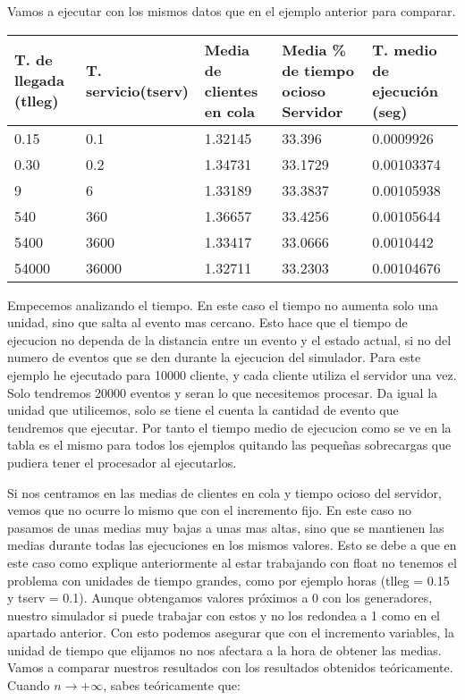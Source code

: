 \documentclass[]{article}
\begin{document}
Vamos a ejecutar con los mismos datos que en el ejemplo anterior para comparar.
	\begin{table}[H]
		\begin{center}
			\begin{tabularx}{0.9\textwidth}{|X|X|X|X|X|}
				\hline
				\textbf{T. de llegada (tlleg)} & \textbf{T. servicio(tserv)}&\textbf{Media de clientes en cola} & \textbf{Media \% de tiempo ocioso Servidor} & \textbf{T. medio de ejecución (seg)} \\
				\hline \hline
				0.15 & 0.1 & 1.32145 & 33.396 &0.0009926\\ \hline
				0.30 & 0.2 & 1.34731 & 33.1729 &0.00103374 \\ \hline
				9 & 6& 1.33189 & 33.3837  &0.00105938\\ \hline
				540 & 360 & 1.36657 &33.4256 & 0.00105644 \\ \hline
				5400 & 3600 & 1.33417 & 33.0666 &0.0010442\\ \hline
				54000 & 36000 & 1.32711  & 33.2303 & 0.00104676 \\ \hline
				
			\end{tabularx}
			
		\end{center}
	\end{table}
Empecemos analizando el tiempo. En este caso el tiempo no aumenta solo una unidad, sino que salta al evento mas cercano. Esto hace que el tiempo de ejecucion no dependa de la distancia entre un evento y el estado actual, si no del numero de eventos que se den durante la ejecucion del simulador. Para este ejemplo he ejecutado para 10000 cliente, y cada cliente utiliza el servidor una vez. Solo tendremos 20000 eventos y seran lo que necesitemos procesar. Da igual la unidad que utilicemos, solo se tiene el cuenta la cantidad de evento que tendremos que ejecutar. Por tanto el tiempo medio de ejecucion como se ve en la tabla es el mismo para todos los ejemplos quitando las pequeñas sobrecargas que pudiera tener el procesador al ejecutarlos.
\newline

Si nos centramos en las medias de clientes en cola y tiempo ocioso del servidor, vemos que no ocurre lo mismo que con el incremento fijo. En este caso no pasamos de unas medias muy bajas a unas mas altas, sino que se mantienen las medias durante todas las ejecuciones en los mismos valores. Esto se debe a que en este caso como explique anteriormente al estar trabajando con float no tenemos el problema con unidades de tiempo grandes, como por ejemplo horas (tlleg = 0.15 y tserv = 0.1). Aunque obtengamos valores próximos a 0 con los generadores, nuestro simulador si puede trabajar con estos y no los redondea a 1 como en el apartado anterior. Con esto podemos asegurar que con el incremento variables, la unidad de tiempo que elijamos no nos afectara a la hora de obtener las medias.
\newline
\newpage
Vamos a comparar nuestros resultados con los resultados obtenidos teóricamente. Cuando $n \rightarrow+\infty$, sabes teóricamente que:
 
\end{document}
